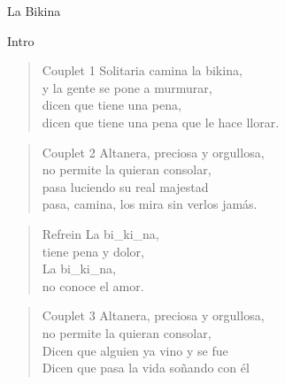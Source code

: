 \begin{song}[joropo]{La Bikina}
\begin{instrumental}{Intro}
 \measure{}  \measure{}  \measure{}          
\end{instrumental}

\begin{verse}{Couplet 1}
Solitaria camina la bikina,\\
y la gente se pone a murmurar,\hspace{1em}\\
dicen que tiene una pena,\\
dicen que tiene una pena que le hace llorar. 
\end{verse}

\begin{verse}{Couplet 2}
Altanera, preciosa y orgullosa,\\
no permite la quieran consolar, \hspace{1em}\\
pasa luciendo su real majestad\\
pasa, camina, los mira sin verlos jamás.\\
\end{verse}

\begin{verse}{Refrein}
La bi\_ki\_na,\hspace{1em}\\
tiene pena y dolor,\\
La bi\_ki\_na,\hspace{1em}\\
no conoce el amor. \hspace{1em} \hspace{1em}\\
\end{verse}

\begin{verse}{Couplet 3}
Altanera, preciosa y orgullosa,\\
no permite la quieran consolar, \\
Dicen que alguien ya vino y se fue\\
Dicen que pasa la vida soñando con él\\
\end{verse}


\end{song}
